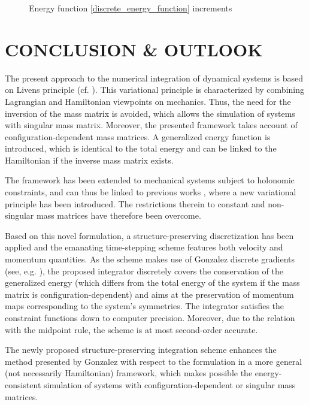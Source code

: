 \documentclass{multibody2023_full_paper}
\newlength\figH
\newlength\figW
\begin{document}
\begin{figure}[htb]
    \centering
    \setlength{\figH}{0.18\textheight}
    \setlength{\figW}{0.6\textwidth}
    
    \caption{Energy function \eqref{discrete_energy_function} increments}
    \label{fig:springPendulum_energy_function_diff}
\end{figure}

\section{CONCLUSION \& OUTLOOK}\label{sec_conclusion}

The present approach to the numerical integration of dynamical systems is based on Livens principle (cf. \cite{livens_hamiltons_1919}). This variational principle is characterized by combining Lagrangian and Hamiltonian viewpoints on mechanics. Thus, the need for the inversion of the mass matrix is avoided, which allows the simulation of systems with singular mass matrix. Moreover, the presented framework takes account of configuration-dependent mass matrices. A generalized energy function is introduced, which is identical to the total energy and can be linked to the Hamiltonian if the inverse mass matrix exists.

The framework has been extended to mechanical systems subject to holonomic constraints, and can thus be linked to previous works \cite{kinon_ggl_2023, kinon_structure_2023}, where a new variational principle has been introduced. The restrictions therein to constant and non-singular mass matrices have therefore been overcome.

Based on this novel formulation, a structure-preserving discretization has been applied and the emanating time-stepping scheme features both velocity and momentum quantities. As the scheme makes use of Gonzalez discrete gradients (see, e.g. \cite{gonzalez_time_1996}), the proposed integrator discretely covers the conservation of the generalized energy (which differs from the total energy of the system if the mass matrix is configuration-dependent) and aims at the preservation of momentum maps corresponding to the system's symmetries. The integrator satisfies the constraint functions down to computer precision. Moreover, due to the relation with the midpoint rule, the scheme is at most second-order accurate.

The newly proposed structure-preserving integration scheme enhances the method presented by Gonzalez \cite{gonzalez_mechanical_1999} with respect to the formulation in a more general (not necessarily Hamiltonian) framework, which makes possible the energy-consistent simulation of systems with configuration-dependent or singular mass matrices.
\end{document}
